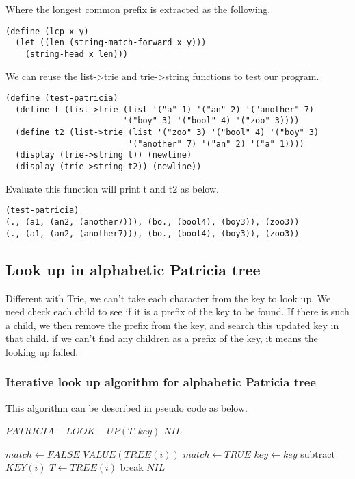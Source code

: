 \documentclass{article}
\begin{document}
Where the longest common prefix is extracted as the following.

\begin{lstlisting}
(define (lcp x y)
  (let ((len (string-match-forward x y)))
    (string-head x len)))
\end{lstlisting}

We can reuse the list->trie and trie->string functions to test our
program.

\begin{lstlisting}
(define (test-patricia)
  (define t (list->trie (list '("a" 1) '("an" 2) '("another" 7) 
                        '("boy" 3) '("bool" 4) '("zoo" 3))))
  (define t2 (list->trie (list '("zoo" 3) '("bool" 4) '("boy" 3) 
                         '("another" 7) '("an" 2) '("a" 1))))
  (display (trie->string t)) (newline)
  (display (trie->string t2)) (newline))
\end{lstlisting}

Evaluate this function will print t and t2 as below.

\begin{lstlisting}
(test-patricia)
(., (a1, (an2, (another7))), (bo., (bool4), (boy3)), (zoo3))
(., (a1, (an2, (another7))), (bo., (bool4), (boy3)), (zoo3))
\end{lstlisting}

\subsection{Look up in alphabetic Patricia tree}
Different with Trie, we can't take each character from the key to look up.
We need check each child to see if it is a prefix of the key to be found.
If there is such a child, we then remove the prefix from 
the key, and search this updated key in that child. if we can't find any
children as a prefix of the key, it means the looking up failed.

\subsubsection{Iterative look up algorithm for alphabetic Patricia tree}

This algorithm can be described in pseudo code as below.
\begin{algorithmic}
\STATE $PATRICIA-LOOK-UP(T, key)$
     \RETURN $NIL$ \ENDIF

  \REPEAT
    \STATE $match \leftarrow FALSE$
        \RETURN $VALUE(TREE(i))$
      \ENDIF
        \STATE $match \leftarrow TRUE$
        \STATE $key \leftarrow key$ subtract $KEY(i)$
        \STATE $T \leftarrow TREE(i)$
        \STATE break
      \ENDIF
    \ENDFOR
  \RETURN $NIL$
\end{algorithmic}
\end{document}
